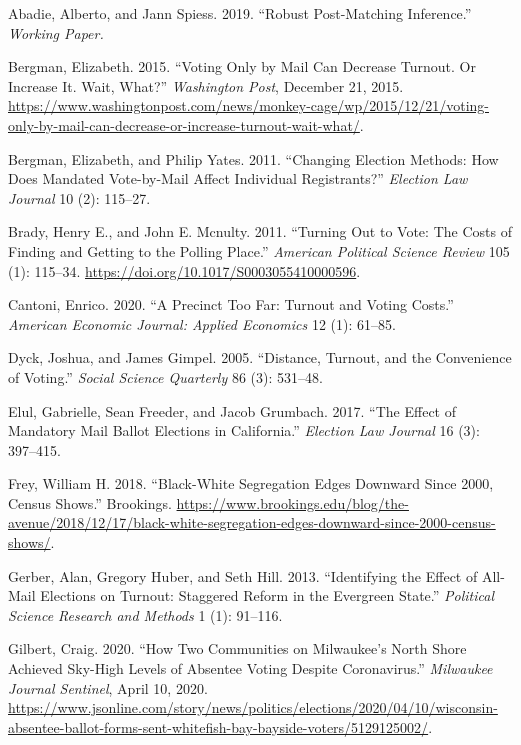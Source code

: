\documentclass[
  12pt,
]{article}
\newlength{\cslhangindent}
\newenvironment{cslreferences}%
  {\setlength{\parindent}{0pt}%
  \everypar{\setlength{\hangindent}{\cslhangindent}}\ignorespaces}%
  {\par}
\begin{document}
\hypertarget{refs}{}
\begin{cslreferences}
\leavevmode\hypertarget{ref-Abadie2019}{}%
Abadie, Alberto, and Jann Spiess. 2019. ``Robust Post-Matching Inference.'' \emph{Working Paper.}

\leavevmode\hypertarget{ref-Bergman2015}{}%
Bergman, Elizabeth. 2015. ``Voting Only by Mail Can Decrease Turnout. Or Increase It. Wait, What?'' \emph{Washington Post}, December 21, 2015. \url{https://www.washingtonpost.com/news/monkey-cage/wp/2015/12/21/voting-only-by-mail-can-decrease-or-increase-turnout-wait-what/}.

\leavevmode\hypertarget{ref-Bergman2011}{}%
Bergman, Elizabeth, and Philip Yates. 2011. ``Changing Election Methods: How Does Mandated Vote-by-Mail Affect Individual Registrants?'' \emph{Election Law Journal} 10 (2): 115--27.

\leavevmode\hypertarget{ref-Brady2011}{}%
Brady, Henry E., and John E. Mcnulty. 2011. ``Turning Out to Vote: The Costs of Finding and Getting to the Polling Place.'' \emph{American Political Science Review} 105 (1): 115--34. \url{https://doi.org/10.1017/S0003055410000596}.

\leavevmode\hypertarget{ref-Cantoni2020}{}%
Cantoni, Enrico. 2020. ``A Precinct Too Far: Turnout and Voting Costs.'' \emph{American Economic Journal: Applied Economics} 12 (1): 61--85.

\leavevmode\hypertarget{ref-Dyck2005}{}%
Dyck, Joshua, and James Gimpel. 2005. ``Distance, Turnout, and the Convenience of Voting.'' \emph{Social Science Quarterly} 86 (3): 531--48.

\leavevmode\hypertarget{ref-Elul2017}{}%
Elul, Gabrielle, Sean Freeder, and Jacob Grumbach. 2017. ``The Effect of Mandatory Mail Ballot Elections in California.'' \emph{Election Law Journal} 16 (3): 397--415.

\leavevmode\hypertarget{ref-Frey2018}{}%
Frey, William H. 2018. ``Black-White Segregation Edges Downward Since 2000, Census Shows.'' Brookings. \url{https://www.brookings.edu/blog/the-avenue/2018/12/17/black-white-segregation-edges-downward-since-2000-census-shows/}.

\leavevmode\hypertarget{ref-Gerber2013}{}%
Gerber, Alan, Gregory Huber, and Seth Hill. 2013. ``Identifying the Effect of All-Mail Elections on Turnout: Staggered Reform in the Evergreen State.'' \emph{Political Science Research and Methods} 1 (1): 91--116.

\leavevmode\hypertarget{ref-Gilbert2020}{}%
Gilbert, Craig. 2020. ``How Two Communities on Milwaukee's North Shore Achieved Sky-High Levels of Absentee Voting Despite Coronavirus.'' \emph{Milwaukee Journal Sentinel}, April 10, 2020. \url{https://www.jsonline.com/story/news/politics/elections/2020/04/10/wisconsin-absentee-ballot-forms-sent-whitefish-bay-bayside-voters/5129125002/}.


\end{cslreferences}
\end{document}
